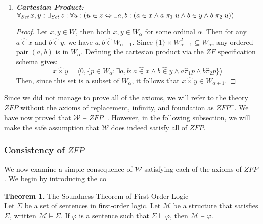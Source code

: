 \documentclass[11pt]{report}
\newcommand{\all}[1]{\forall_{\mathit{#1}}\hspace{0.5mm}}
\newcommand{\ex}[1]{\exists_{\mathit{#1}}\hspace{0.5mm}}
\newcommand{\pleft}{\mathrel{\pi_1}}
\newcommand{\pright}{\mathrel{\pi_2}}
\newcommand{\pair}[2]{\langle #1,#2 \rangle}
\newcommand{\zin}{\mathrel{\widehat{\in}}}
\newcommand{\zpright}{\mathrel{\widehat{\pi}_2}}
\newcommand{\zpleft}{\mathrel{\widehat{\pi}_1}}
\theoremstyle{definition}
\theoremstyle{theorem}
\theoremstyle{lemma}
\newtheorem{theorem}{Theorem}[section]
\begin{document}
\begin{enumerate}[resume=axiomlist, label=\Roman*.]
\item \textit{\textbf{Cartesian Product:} } \\$\all{Set} x,y: \ex{Set} z:
 \forall u: (u \in z \Leftrightarrow
 \exists a,b: (a \in x \wedge a\pleft u \wedge b\in y \wedge b\pright u))$
\begin{proof}
Let $x,y \in W$, then both $x,y\in W_\alpha$ for some ordinal $\alpha$.
Then for any $a\zin x$ and $b\zin y$, we have $a, b \zin W_{\alpha-1}$.
Since $\{1\} \times W_{\alpha-1}^2 \subseteq W_\alpha$, any ordered pair $(a,b)$ is in $W_{\alpha}$. 
Defining the cartesian product via the $\mathit{ZF}$ specification schema gives: 
$$x \widehat{\times}y = \pair{0}{\{p\in W_\alpha : \exists a, b: a\zin x \wedge b\zin y \wedge a\zpleft p \wedge b\zpright p\}}$$
Then, since this set is a subset of $W_\alpha$, it follows that $x\widehat{\times} y \in W_{\alpha + 1}$. 
\end{proof}
\end{enumerate}
Since we did not manage to prove all of the axioms, we will refer to the theory $\mathit{ZFP}$ without the axioms of replacement, infinity, and foundation as $\mathit{ZFP}^{-}$. 
We have now proved that $\mathcal{W} \vDash \mathit{ZFP}^{-}$. 
However, in the following subsection, we will make the safe assumption that $\mathcal{W}$ does indeed satisfy all of $\mathit{ZFP}$. 

\subsubsection{Consistency of $\mathit{ZFP}$}
We now examine a simple consequence of $\mathcal{W}$ satisfying each of the axioms of $\mathit{ZFP}$.
We begin by introducing the co
\begin{theorem}The Soundness Theorem of First-Order Logic\\
Let $\Sigma$ be a set of sentences in first-order logic. 
Let $\mathcal{M}$ be a structure that satisfies $\Sigma$, written $\mathcal{M} \vDash \Sigma$. 
If $\varphi$ is a sentence such that $\Sigma \vdash \varphi$, then $\mathcal{M} \vDash \varphi$.
\end{theorem}
\end{document}
